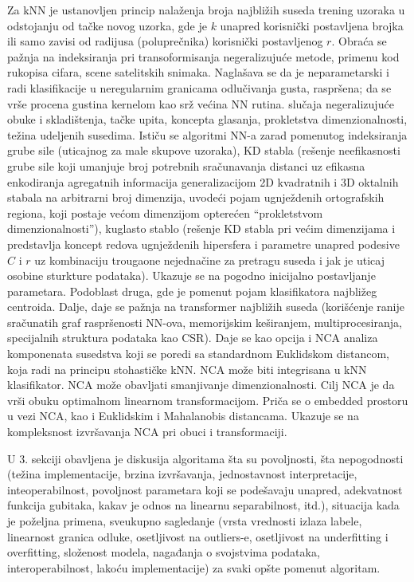 \documentclass[fontsize=12bp, paper=a4]{scrarticle}
\begin{document}
Za kNN je ustanovljen princip nalaženja broja najbližih suseda trening uzoraka u odstojanju od tačke novog uzorka, gde je $k$ unapred korisnički postavljena brojka ili samo zavisi od radijusa (poluprečnika) korisnički postavljenog $r$. Obraća se pažnja na indeksiranja pri transoformisanja negeralizujuće metode, primenu kod rukopisa cifara, scene satelitskih snimaka. Naglašava se da je neparametarski i radi klasifikacije u neregularnim granicama odlučivanja gusta, raspršena; da se vrše procena gustina kernelom kao srž većina NN rutina. slučaja negeralizujuće obuke i skladištenja, tačke upita, koncepta glasanja, prokletstva dimenzionalnosti, težina udeljenih susedima. Ističu se algoritmi NN-a zarad pomenutog indeksiranja grube sile (uticajnog za male skupove uzoraka), KD stabla (rešenje neefikasnosti grube sile koji umanjuje broj potrebnih sračunavanja distanci uz efikasna enkodiranja agregatnih informacija generalizacijom 2D kvadratnih i 3D oktalnih stabala na arbitrarni broj dimenzija, uvodeći pojam ugnježdenih ortografskih regiona, koji postaje većom dimenzijom opterećen ``prokletstvom dimenzionalnosti''), kuglasto stablo (rešenje KD stabla pri većim dimenzijama i predstavlja koncept redova ugnježdenih hipersfera i parametre unapred podesive $C$ i $r$ uz kombinaciju trougaone nejednačine za pretragu suseda i jak je uticaj osobine sturkture podataka). Ukazuje se na pogodno inicijalno postavljanje parametara. Podoblast druga, gde je  pomenut pojam klasifikatora najbližeg centroida. Dalje, daje se pažnja na transformer najbližih suseda (korišćenje ranije sračunatih graf raspršenosti NN-ova, memorijskim keširanjem, multiprocesiranja, specijalnih struktura podataka kao CSR). Daje se kao opcija i NCA analiza komponenata susedstva koji se poredi sa standardnom Euklidskom distancom, koja radi na principu stohastičke kNN. NCA može biti integrisana u kNN klasifikator. NCA može obavljati smanjivanje dimenzionalnosti. Cilj NCA je da vrši obuku optimalnom linearnom transformacijom. Priča se o embedded prostoru u vezi NCA, kao i Euklidskim i Mahalanobis distancama. Ukazuje se na kompleksnost izvršavanja NCA pri obuci i transformaciji.

\vbox{}

U 3. sekciji obavljena je diskusija algoritama šta su povoljnosti, šta nepogodnosti (težina implementacije, brzina izvršavanja, jednostavnost interpretacije, inteoperabilnost, povoljnost parametara koji se podešavaju unapred, adekvatnost funkcija gubitaka, kakav je odnos na linearnu separabilnost, itd.), situacija kada je poželjna primena, sveukupno sagledanje (vrsta vrednosti izlaza labele, linearnost granica odluke, osetljivost na outliers-e, osetljivost na underfitting i overfitting, složenost modela, nagađanja o svojstvima podataka, interoperabilnost, lakoću implementacije) za svaki opšte pomenut algoritam.
\end{document}

